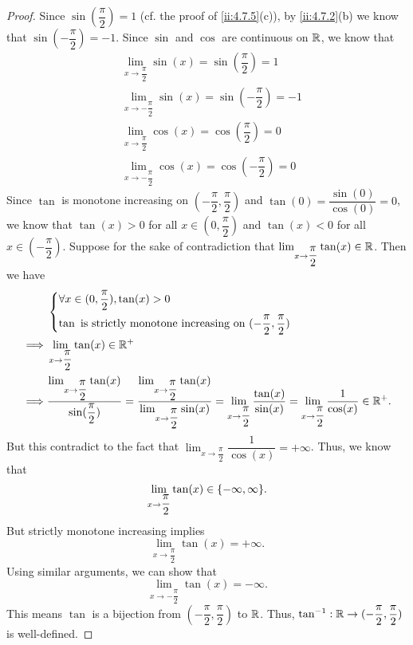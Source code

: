 \begin{proof}
  Since \(\sin(\dfrac{\pi}{2}) = 1\) (cf. the proof of \cref{ii:4.7.5}(c)), by \cref{ii:4.7.2}(b) we know that \(\sin(-\dfrac{\pi}{2}) = -1\).
  Since \(\sin\) and \(\cos\) are continuous on \(\mathbb{R}\), we know that
  \begin{align*}
     & \lim_{x \to \dfrac{\pi}{2}} \sin(x) = \sin(\dfrac{\pi}{2}) = 1    \\
     & \lim_{x \to -\dfrac{\pi}{2}} \sin(x) = \sin(-\dfrac{\pi}{2}) = -1 \\
     & \lim_{x \to \dfrac{\pi}{2}} \cos(x) = \cos(\dfrac{\pi}{2}) = 0    \\
     & \lim_{x \to -\dfrac{\pi}{2}} \cos(x) = \cos(-\dfrac{\pi}{2}) = 0
  \end{align*}
  Since \(\tan\) is monotone increasing on \((-\dfrac{\pi}{2}, \dfrac{\pi}{2})\) and \(\tan(0) = \dfrac{\sin(0)}{\cos(0)} = 0\), we know that \(\tan(x) > 0\) for all \(x \in (0, \dfrac{\pi}{2})\) and \(\tan(x) < 0\) for all \(x \in (-\dfrac{\pi}{2})\).
  Suppose for the sake of contradiction that \(\lim_{x \to \dfrac{\pi}{2}} \tan(x) \in \mathbb{R}\).
  Then we have
  \begin{align*}
             & \begin{dcases}
                 \forall x \in (0, \dfrac{\pi}{2}), \tan(x) > 0 \\
                 \tan \text{ is strictly monotone increasing on } (-\dfrac{\pi}{2}, \dfrac{\pi}{2})
               \end{dcases}                                                                                                                                                                                      \\
    \implies & \lim_{x \to \dfrac{\pi}{2}} \tan(x) \in \mathbb{R}^+                                                                                                                                                                                                                           \\
    \implies & \dfrac{\lim_{x \to \dfrac{\pi}{2}} \tan(x)}{\sin(\dfrac{\pi}{2})} = \dfrac{\lim_{x \to \dfrac{\pi}{2}} \tan(x)}{\lim_{x \to \dfrac{\pi}{2}} \sin(x)} = \lim_{x \to \dfrac{\pi}{2}} \dfrac{\tan(x)}{\sin(x)} = \lim_{x \to \dfrac{\pi}{2}} \dfrac{1}{\cos(x)} \in \mathbb{R}^+.
  \end{align*}
  But this contradict to the fact that \(\lim_{x \to \dfrac{\pi}{2}} \dfrac{1}{\cos(x)} = +\infty\).
  Thus, we know that
  \[
    \lim_{x \to \dfrac{\pi}{2}} \tan(x) \in \set{-\infty, \infty}.
  \]
  But strictly monotone increasing implies
  \[
    \lim_{x \to \dfrac{\pi}{2}} \tan(x) = +\infty.
  \]
  Using similar arguments, we can show that
  \[
    \lim_{x \to -\dfrac{\pi}{2}} \tan(x) = -\infty.
  \]
  This means \(\tan\) is a bijection from \((-\dfrac{\pi}{2}, \dfrac{\pi}{2})\) to \(\mathbb{R}\).
  Thus, \(\tan^{-1} : \mathbb{R} \to (-\dfrac{\pi}{2}, \dfrac{\pi}{2})\) is well-defined.


\end{proof}
